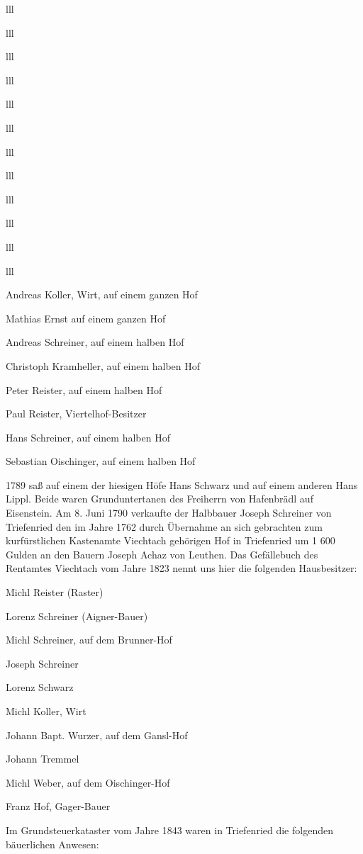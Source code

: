 \documentclass[12pt,a4pager]{book}
\begin{document}
\begin{tabuluar}{lll}
\begin{tabuluar}{lll}
\begin{tabuluar}{lll}
\begin{tabuluar}{lll}
\begin{tabuluar}{lll}
\begin{tabuluar}{lll}
\begin{tabuluar}{lll}
\begin{tabuluar}{lll}
\begin{tabuluar}{lll}
\begin{tabuluar}{lll}
\begin{tabuluar}{lll}
\begin{tabuluar}{lll}
\begin{compactitem}
\item Andreas Koller, Wirt, auf einem ganzen Hof
\item Mathias Ernst auf einem ganzen Hof
\item Andreas Schreiner, auf einem halben Hof
\item Christoph Kramheller, auf einem halben Hof
\item Peter Reister, auf einem halben Hof
\item Paul Reister, Viertelhof-Besitzer
\item Hans Schreiner, auf einem halben Hof
\item Sebastian Oischinger, auf einem halben Hof
\end{compactitem}

1789 saß auf einem der hiesigen Höfe Hans Schwarz und auf einem anderen Hans
Lippl. Beide waren Grunduntertanen des Freiherrn von Hafenbrädl auf Eisenstein.
Am 8. Juni 1790 verkaufte der Halbbauer Joseph Schreiner von Triefenried den im
Jahre 1762 durch Übernahme an sich gebrachten zum kurfürstlichen Kastenamte
Viechtach gehörigen Hof in Triefenried um 1 600 Gulden an den Bauern Joseph
Achaz von Leuthen. Das Gefällebuch des Rentamtes Viechtach vom Jahre 1823 nennt
uns hier die folgenden Hausbesitzer:

\begin{compactitem}
\item Michl Reister (Raster)
\item Lorenz Schreiner (Aigner-Bauer)
\item Michl Schreiner, auf dem Brunner-Hof
\item Joseph Schreiner
\item Lorenz Schwarz
\item Michl Koller, Wirt
\item Johann Bapt. Wurzer, auf dem Gansl-Hof
\item Johann Tremmel
\item Michl Weber, auf dem Oischinger-Hof
\item Franz Hof, Gager-Bauer
\end{compactitem}

Im Grundsteuerkataster vom Jahre 1843 waren in Triefenried die folgenden
bäuerlichen Anwesen:


\end{tabuluar}
\end{tabuluar}
\end{tabuluar}
\end{tabuluar}
\end{tabuluar}
\end{tabuluar}
\end{tabuluar}
\end{tabuluar}
\end{tabuluar}
\end{tabuluar}
\end{tabuluar}
\end{tabuluar}
\end{document}
